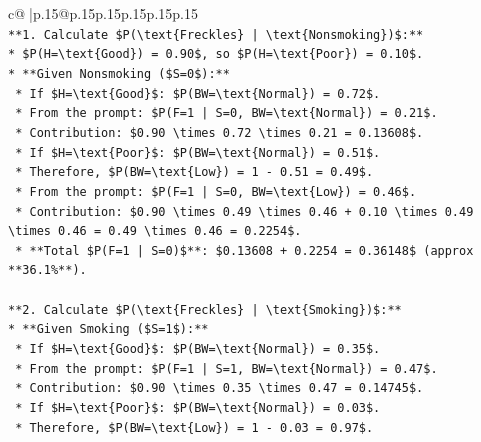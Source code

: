 \documentclass{article}
\begin{document}
{\begin{supertabular}{c@{$\;$}|p{.15\linewidth}@{}p{.15\linewidth}p{.15\linewidth}p{.15\linewidth}p{.15\linewidth}p{.15\linewidth}}
{{{\\ 
\texttt{**1. Calculate \$P(\textbackslash{}text\{Freckles\} | \textbackslash{}text\{Nonsmoking\})\$:**} \\
\texttt{*   \$P(H=\textbackslash{}text\{Good\}) = 0.90\$, so \$P(H=\textbackslash{}text\{Poor\}) = 0.10\$.} \\
\texttt{*   **Given Nonsmoking (\$S=0\$):**} \\
\texttt{    *   If \$H=\textbackslash{}text\{Good\}\$: \$P(BW=\textbackslash{}text\{Normal\}) = 0.72\$.} \\
\texttt{        *   From the prompt: \$P(F=1 | S=0, BW=\textbackslash{}text\{Normal\}) = 0.21\$.} \\
\texttt{        *   Contribution: \$0.90 \textbackslash{}times 0.72 \textbackslash{}times 0.21 = 0.13608\$.} \\
\texttt{    *   If \$H=\textbackslash{}text\{Poor\}\$: \$P(BW=\textbackslash{}text\{Normal\}) = 0.51\$.} \\
\texttt{        *   Therefore, \$P(BW=\textbackslash{}text\{Low\}) = 1 {-} 0.51 = 0.49\$.} \\
\texttt{        *   From the prompt: \$P(F=1 | S=0, BW=\textbackslash{}text\{Low\}) = 0.46\$.} \\
\texttt{        *   Contribution: \$0.90 \textbackslash{}times 0.49 \textbackslash{}times 0.46 + 0.10 \textbackslash{}times 0.49 \textbackslash{}times 0.46 = 0.49 \textbackslash{}times 0.46 = 0.2254\$.} \\
\texttt{    *   **Total \$P(F=1 | S=0)\$**: \$0.13608 + 0.2254 = 0.36148\$ (approx **36.1\%**).} \\
\\ 
\texttt{**2. Calculate \$P(\textbackslash{}text\{Freckles\} | \textbackslash{}text\{Smoking\})\$:**} \\
\texttt{*   **Given Smoking (\$S=1\$):**} \\
\texttt{    *   If \$H=\textbackslash{}text\{Good\}\$: \$P(BW=\textbackslash{}text\{Normal\}) = 0.35\$.} \\
\texttt{        *   From the prompt: \$P(F=1 | S=1, BW=\textbackslash{}text\{Normal\}) = 0.47\$.} \\
\texttt{        *   Contribution: \$0.90 \textbackslash{}times 0.35 \textbackslash{}times 0.47 = 0.14745\$.} \\
\texttt{    *   If \$H=\textbackslash{}text\{Poor\}\$: \$P(BW=\textbackslash{}text\{Normal\}) = 0.03\$.} \\
\texttt{        *   Therefore, \$P(BW=\textbackslash{}text\{Low\}) = 1 {-} 0.03 = 0.97\$.} \\
}}}
\end{supertabular}}
\end{document}
